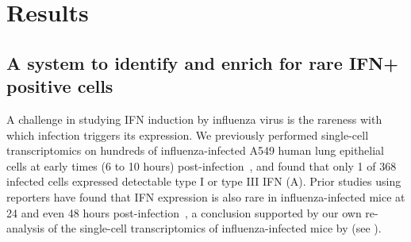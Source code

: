 \documentclass[9pt,lineno]{elife}
\begin{document}
\section{Results}

\subsection{A system to identify and enrich for rare IFN+ positive cells}
A challenge in studying IFN induction by influenza virus is the rareness with which infection triggers its expression.
We previously performed single-cell transcriptomics on hundreds of influenza-infected A549 human lung epithelial cells at early times (6 to 10 hours) post-infection~\citep{russell2018extreme}, and found that only 1 of 368 infected cells expressed detectable type I or type III IFN (A).
Prior studies using reporters have found that IFN expression is also rare in influenza-infected mice at 24 and even 48 hours post-infection~\citep{kallfass2013visualizing}, a conclusion supported by our own re-analysis of the single-cell transcriptomics of influenza-infected mice by \citet{steuerman2018dissection} (see ).
\end{document}
